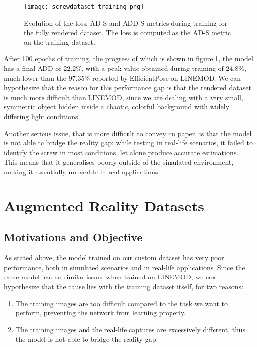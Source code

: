 \begin{figure}[ht]
    \texttt{[image: screwdataset\_training.png]}
    \caption{Evolution of the loss, AD-S and ADD-S metrics during training for the fully rendered dataset. The loss is computed as the AD-S metric on the training dataset.}
    \label{fig:screwdataset_training}
\end{figure}

After 100 epochs of training, the progress of which is shown in figure \ref{fig:screwdataset_training}, the model has a final ADD of 22.2\%, with a peak value obtained during training of 24.8\%, much lower than the 97.35\% reported by EfficientPose on LINEMOD. We can hypothesize that the reason for this performance gap is that the rendered dataset is much more difficult than LINEMOD, since we are dealing with a very small, symmetric object hidden inside a chaotic, colorful background with widely differing light conditions.

Another serious issue, that is more difficult to convey on paper, is that the model is not able to bridge the reality gap: while testing in real-life scenarios, it failed to identify the screw in most conditions, let alone produce accurate estimations. This means that it generalises poorly outside of the simulated environment, making it essentially unuseable in real applications.

\section{Augmented Reality Datasets}

\subsection{Motivations and Objective}

As stated above, the model trained on our custom dataset has very poor performance, both in simulated scenarios and in real-life applications. Since the same model has no similar issues when trained on LINEMOD, we can hypothesize that the cause lies with the training dataset itself, for two reasons:

\begin{enumerate}
    \item The training images are too difficult compared to the task we want to perform, preventing the network from learning properly.
    \item The training images and the real-life captures are excessively different, thus the model is not able to bridge the reality gap.
\end{enumerate}

